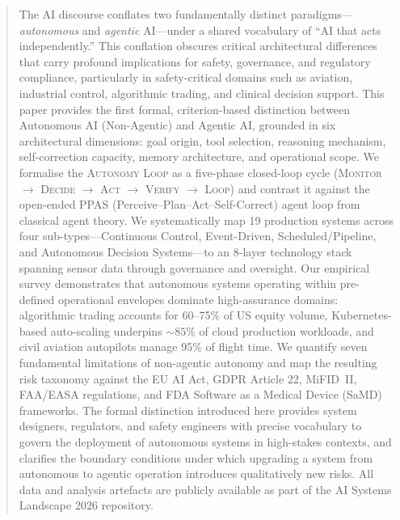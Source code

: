 \documentclass[12pt, a4paper]{article}
\begin{document}
\begin{abstract}
\noindent
The AI discourse conflates two fundamentally distinct paradigms---\emph{autonomous} and \emph{agentic} AI---under a shared vocabulary of ``AI that acts independently.'' This conflation obscures critical architectural differences that carry profound implications for safety, governance, and regulatory compliance, particularly in safety-critical domains such as aviation, industrial control, algorithmic trading, and clinical decision support. This paper provides the first formal, criterion-based distinction between Autonomous AI (Non-Agentic) and Agentic AI, grounded in six architectural dimensions: goal origin, tool selection, reasoning mechanism, self-correction capacity, memory architecture, and operational scope. We formalise the \textsc{Autonomy Loop} as a five-phase closed-loop cycle (\textsc{Monitor $\rightarrow$ Decide $\rightarrow$ Act $\rightarrow$ Verify $\rightarrow$ Loop}) and contrast it against the open-ended PPAS (Perceive--Plan--Act--Self-Correct) agent loop from classical agent theory. We systematically map 19 production systems across four sub-types---Continuous Control, Event-Driven, Scheduled/Pipeline, and Autonomous Decision Systems---to an 8-layer technology stack spanning sensor data through governance and oversight. Our empirical survey demonstrates that autonomous systems operating within pre-defined operational envelopes dominate high-assurance domains: algorithmic trading accounts for 60--75\% of US equity volume, Kubernetes-based auto-scaling underpins ${\sim}85\%$ of cloud production workloads, and civil aviation autopilots manage 95\% of flight time. We quantify seven fundamental limitations of non-agentic autonomy and map the resulting risk taxonomy against the EU AI Act, GDPR Article 22, MiFID~II, FAA/EASA regulations, and FDA Software as a Medical Device (SaMD) frameworks. The formal distinction introduced here provides system designers, regulators, and safety engineers with precise vocabulary to govern the deployment of autonomous systems in high-stakes contexts, and clarifies the boundary conditions under which upgrading a system from autonomous to agentic operation introduces qualitatively new risks. All data and analysis artefacts are publicly available as part of the AI Systems Landscape 2026 repository.
\end{abstract}

\medskip
\end{document}
